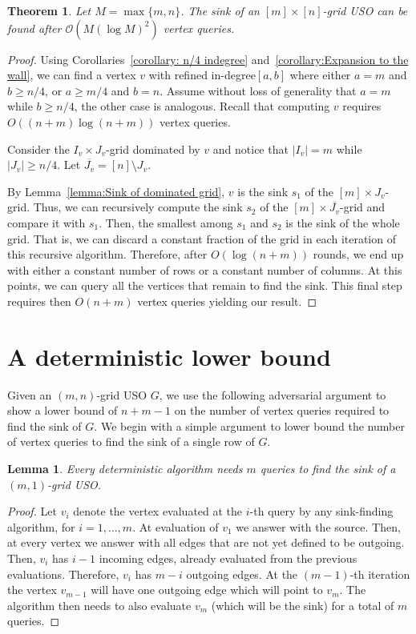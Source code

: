\documentclass[a4paper,10pt]{article}
\newtheorem{lemma}{Lemma}
\newtheorem{theorem}{Theorem}
\newcommand{\indegree}{refined in-degree\xspace}
\begin{document}
\begin{theorem}\label{theorem:Sink algorithm}
 Let $M = \max\{m,n\}$. The sink of an $[m]\times[n]$-grid USO can be found after $\mathcal{O}(M(\log M)^2)$ vertex queries.
\end{theorem}
\begin{proof}
Using  Corollaries~\ref{corollary: n/4 indegree} and~\ref{corollary:Expansion to the wall}, we can find a vertex $v$ with \indegree $[a,b]$ where either $a = m$ and $b \geq  n/4$, or $a \geq  m/4$ and $b  = n$. Assume without loss of generality that $a = m$ while $b\geq  n/4$, the other case is analogous. Recall that computing $v$ requires $O((n + m) \log (n+m))$ vertex queries.

Consider the $I_v\times J_v$-grid dominated by $v$ and 
notice that $|I_v| = m$ while $|J_v| \geq n/4$. Let $\overline{J_v} = [n]\setminus J_v$.

By Lemma~\ref{lemma:Sink of dominated grid}, $v$ is the sink $s_1$ of the $[m] \times J_v$-grid. Thus, we can recursively compute the sink $s_2$ of the $[m]\times \overline{J_v}$-grid and compare it with $s_1$. Then, the smallest among $s_1$ and $s_2$ is the sink of the whole grid.
That is, we can discard a constant fraction of the grid in each iteration of this recursive algorithm. Therefore, after $O(\log (n + m))$ rounds, we end up with either a constant number of rows or a constant number of columns. At this points, we can query all the vertices that remain to find the sink. This final step requires then $O(n + m)$ vertex queries yielding our result.
\end{proof}

 
\section{A deterministic lower bound}

Given an $(m, n)$-grid USO $G$, we use the following adversarial argument to show a lower bound of $n + m -1$ on the number of vertex queries required to find the sink of $G$.
We begin with a simple argument to lower bound the number of vertex queries to find the sink of a single row of $G$.

\begin{lemma}\label{lem:kx1}
Every deterministic algorithm needs $m$ queries to find the sink of a $(m,1)$-grid USO. 
\end{lemma}
\begin{proof}
Let $v_i$ denote the vertex evaluated at the $i$-th query by any sink-finding algorithm, for $i=1,\ldots, m$. At evaluation of $v_1$ we answer with the source. Then, at every vertex 
we answer with all edges that are not yet defined to be outgoing. Then, $v_i$ has $i-1$ incoming edges, already evaluated from the previous evaluations. 
Therefore, $v_i$ has $m-i$ outgoing edges. At the $(m-1)$-th iteration the vertex $v_{m-1}$ will have one outgoing edge which will point to $v_m$.
The algorithm then needs to also evaluate $v_m$ (which will be the sink) for a total of $m$ queries. 
\end{proof}
\end{document}
